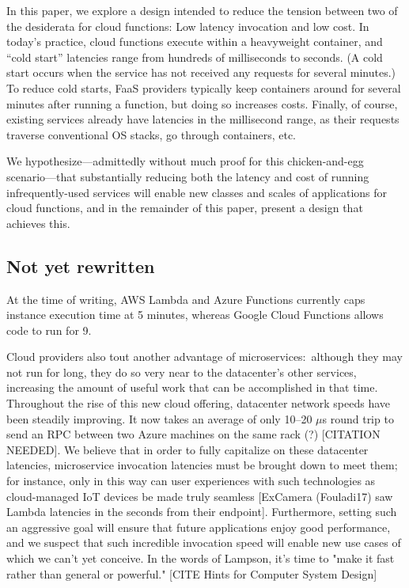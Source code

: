 In this paper, we explore a design intended to reduce the tension between two of
the desiderata for cloud functions:  Low latency invocation and low cost.  In
today's practice, cloud functions execute within a heavyweight container, and
``cold start'' latencies range from hundreds of milliseconds to seconds.  (A
cold start occurs when the service has not received any requests for several
minutes.)  To reduce cold starts, FaaS providers typically keep containers
around for several minutes after running a function, but doing so increases
costs.  Finally, of course, existing services already have latencies in the
millisecond range, as their requests traverse conventional OS stacks, go through
containers, etc.

We hypothesize---admittedly without much proof for this chicken-and-egg
scenario---that substantially reducing both the latency and cost of running
infrequently-used services will enable new classes and scales of applications
for cloud functions, and in the remainder of this paper, present a design that
achieves this.

\subsection{Not yet rewritten}

At the time of writing, AWS Lambda and Azure Functions currently caps instance execution time at 5 minutes, whereas Google Cloud Functions allows code to run for 9.

Cloud providers also tout another advantage of microservices:\ although they may not run for long, they do so very near to the datacenter's other services, increasing the amount of useful work that can be accomplished in that time.
Throughout the rise of this new cloud offering, datacenter network speeds have been steadily improving.
It now takes an average of only 10--20 $\mu$s round trip to send an RPC between two Azure machines on the same rack (?) [CITATION NEEDED].
We believe that in order to fully capitalize on these datacenter latencies, microservice invocation latencies must be brought down to meet them; for instance, only in this way can user experiences with such technologies as cloud-managed IoT devices be made truly seamless [ExCamera (Fouladi17) saw Lambda latencies in the seconds from their endpoint].
Furthermore, setting such an aggressive goal will ensure that future applications enjoy good performance, and we suspect that such incredible invocation speed will enable new use cases of which we can't yet conceive.
In the words of Lampson, it's time to "make it fast rather than general or powerful." [CITE Hints for Computer System Design]

